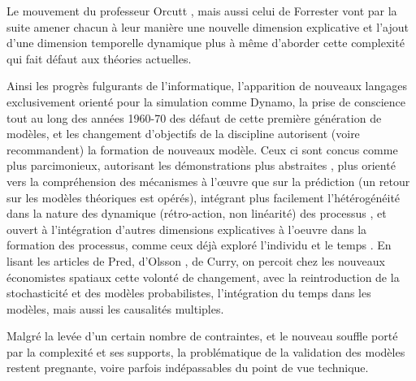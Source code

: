 {Le mouvement du professeur Orcutt \autocite{Orcutt1957}, mais aussi celui de Forrester \autocite{Forrester1961, Forrester1969} vont par la suite amener chacun à leur manière une nouvelle dimension explicative et l'ajout d'une dimension temporelle dynamique plus à même d'aborder cette complexité qui fait défaut aux théories actuelles. \autocite[p295]{Batty1976}

Ainsi les progrès fulgurants de l'informatique, l'apparition de nouveaux langages exclusivement orienté pour la simulation comme Dynamo, la prise de conscience tout au long des années 1960-70 des défaut de cette première génération de modèles, et les changement d'objectifs de la discipline \autocite[12]{Batty1994} \autocite{Boyce1988} autorisent (voire recommandent) la formation de nouveaux modèle. Ceux ci sont concus comme plus parcimonieux, autorisant les démonstrations plus abstraites \autocite{Forrester1969}, plus orienté vers la compréhension des mécanismes à l’œuvre que sur la prédiction (un retour sur les modèles théoriques est opérés), intégrant plus facilement l'hétérogénéité dans la nature des dynamique (rétro-action, non linéarité) des processus \autocite{Forrester1969, Wilson1970, Allen1978}, et ouvert à l'intégration d'autres dimensions explicatives à l'oeuvre dans la formation des processus, comme ceux déjà exploré l'individu et le temps \autocite{Hagerstrand1967a,Orcutt1957,Forrester1961}. En lisant les articles de Pred, d'Olsson \autocite{Olsson1969,Olsson1970}, de Curry, on percoit chez les nouveaux économistes spatiaux cette volonté de changement, avec la reintroduction de la stochasticité et des modèles probabilistes, l'intégration du temps dans les modèles, mais aussi les causalités multiples.



Malgré la levée d'un certain nombre de contraintes, et le nouveau souffle porté par la complexité et ses supports, la problématique de la validation des modèles restent pregnante, voire parfois indépassables du point de vue technique.  \autocite[296]{Batty1976} 

}
